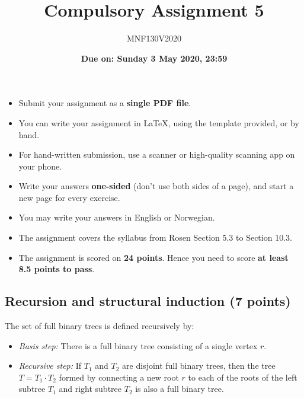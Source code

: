 \documentclass[12pt]{article}
\title{\huge Compulsory Assignment 5}
\author{\LARGE MNF130V2020}
\date{\Large\textbf{Due on: Sunday 3 May 2020, 23:59}}
\begin{document}
\maketitle

\bigskip

  \vspace*{15mm}

  {\large
  \begin{minipage}{\linewidth}
    \begin{itemize}
    \item Submit your assignment as a \textbf{single PDF file}.
      \smallskip
    \item You can write your assignment in \LaTeX, using the template
      provided, or by hand.
      \smallskip
    \item For hand-written submission, use a scanner or high-quality
      scanning app on your phone.
      \smallskip
    \item Write your answers \textbf{one-sided} (don't use both sides
      of a page), and start a new page for every exercise.
      \smallskip
    \item You may write your answers in English or Norwegian.
      \smallskip
    \item The assignment covers the syllabus from Rosen Section 5.3 to
      Section 10.3.
      \smallskip
    \item The assignment is scored on \textbf{24 points}. Hence you
      need to score \textbf{at least 8.5 points to pass}.
  \end{itemize}
  \end{minipage}
  }

\bigskip

\bigskip

\newpage

\subsection{Recursion and structural induction (7 points)}

The set of full binary trees is defined recursively by:
\begin{itemize}
\item \emph{Basis step:} There is a full binary tree consisting of a
  single vertex $r$.
\item \emph{Recursive step:} If $T_1$ and $T_2$ are disjoint full
  binary trees, then the tree $T=T_1\cdot T_2$ formed by connecting
  a new root $r$ to each of the roots of the left subtree $T_1$ and
  right subtree $T_2$ is also a full binary tree.
\end{itemize}
\end{document}
